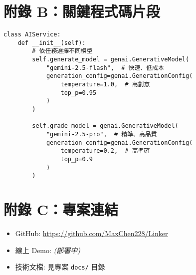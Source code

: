 \documentclass[11pt,a4paper]{article}
\newcommand{\code}[1]{\texttt{\color{Brand}#1}}
\begin{document}
\section*{附錄 B：關鍵程式碼片段}

\begin{lstlisting}[style=py, caption={雙模型初始化配置}]
class AIService:
    def __init__(self):
        # 依任務選擇不同模型
        self.generate_model = genai.GenerativeModel(
            "gemini-2.5-flash",  # 快速、低成本
            generation_config=genai.GenerationConfig(
                temperature=1.0,  # 高創意
                top_p=0.95
            )
        )
        
        self.grade_model = genai.GenerativeModel(
            "gemini-2.5-pro",  # 精準、高品質
            generation_config=genai.GenerationConfig(
                temperature=0.2,  # 高準確
                top_p=0.9
            )
        )
\end{lstlisting}

\section*{附錄 C：專案連結}

\begin{itemize}
  \item GitHub: \url{https://github.com/MaxChen228/Linker}
  \item 線上 Demo: \textit{(部署中)}
  \item 技術文檔: 見專案 \code{docs/} 目錄
\end{itemize}
\end{document}
